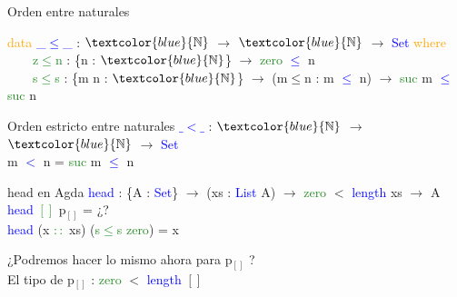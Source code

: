 \documentclass[xcolor=dvipsnames]{beamer} %
\newcommand{\cf}[1]{\textcolor{blue}{#1}}
\newcommand{\ct}[1]{\textcolor{blue}{#1}}
\newcommand{\cc}[1]{\textcolor{ForestGreen}{#1}}
\newcommand{\ck}[1]{\textcolor{orange}{#1}}
\newcommand{\N}{\ct{\mathbb{N}}}
\newcommand{\ra}{\rightarrow}
\begin{document}
\begin{frame}

\begin{block}{Orden entre naturales}

\ck{data} \ct{\_$\leq$\_} : $\N$ $\ra$ $\N$ $\ra$ \ct{Set} \ck{where}\\
\ \ \ \ \cc{z$\leq$n} : \{n : $\N$\}                 $\ra$ \cc{zero}  \ct{$\leq$} n\\
\ \ \ \ \cc{s$\leq$s} : \{m n : $\N$\} $\ra$ (m$\leq$n : m \ct{$\leq$} n) $\ra$ \cc{suc} m \ct{$\leq$} \cc{suc} n

\end{block}

\begin{block}{Orden estricto entre naturales}
\cf{$\_<\_$} : $\N$ $\ra$ $\N$ $\ra$ \ct{Set}\\
m \cf{$<$} n = \cc{suc} m \cf{$\leq$} n
\end{block}

\begin{block}{head en Agda}
    \cf{head} : \{A : \ct{Set}\}  $\ra$ (xs : \ct{List} A) $\ra$ 
    \cc{zero} $<$ \ct{length} xs $\rightarrow$ A \\
    \cf{head} \cc{$[]$} p$_{[]}$ = ¿?\\
    \cf{head} (x \cc{$::$} xs) (\cc{s$\leq$s} \cc{zero}) = x
  \end{block}  

\pause

\begin{block}{}
¿Podremos hacer lo mismo ahora para p$_{[]}$ ?\\ \pause
El tipo de p$_{[]}$ : \cc{zero} $<$ \ct{length} $[]$
\end{block}

\end{frame}
\end{document}
